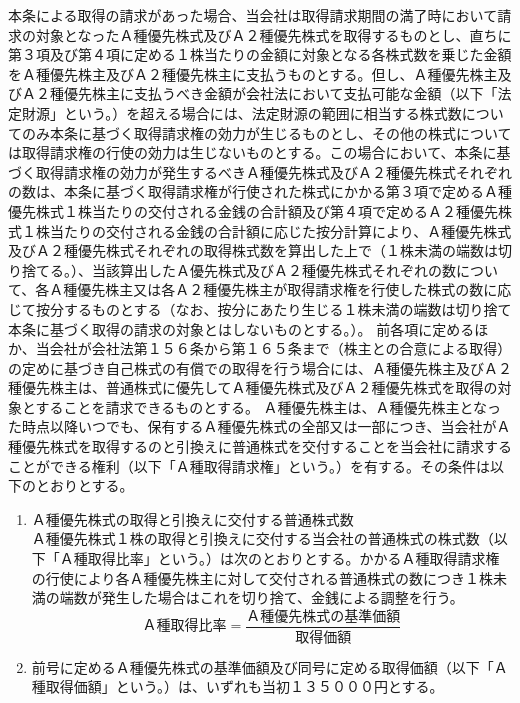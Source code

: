 \documentclass[10pt,a4paper,uplatex]{jsarticle}
\begin{document}
\term 本条による取得の請求があった場合、当会社は取得請求期間の満了時において請求の対象となったＡ種優先株式及びＡ２種優先株式を取得するものとし、直ちに第３項及び第４項に定める１株当たりの金額に対象となる各株式数を乗じた金額をＡ種優先株主及びＡ２種優先株主に支払うものとする。但し、Ａ種優先株主及びＡ２種優先株主に支払うべき金額が会社法において支払可能な金額（以下「法定財源」という。）を超える場合には、法定財源の範囲に相当する株式数についてのみ本条に基づく取得請求権の効力が生じるものとし、その他の株式については取得請求権の行使の効力は生じないものとする。この場合において、本条に基づく取得請求権の効力が発生するべきＡ種優先株式及びＡ２種優先株式それぞれの数は、本条に基づく取得請求権が行使された株式にかかる第３項で定めるＡ種優先株式１株当たりの交付される金銭の合計額及び第４項で定めるＡ２種優先株式１株当たりの交付される金銭の合計額に応じた按分計算により、Ａ種優先株式及びＡ２種優先株式それぞれの取得株式数を算出した上で（１株未満の端数は切り捨てる。）、当該算出したＡ優先株式及びＡ２種優先株式それぞれの数について、各Ａ種優先株主又は各Ａ２種優先株主が取得請求権を行使した株式の数に応じて按分するものとする（なお、按分にあたり生じる１株未満の端数は切り捨て本条に基づく取得の請求の対象とはしないものとする。）。
\term 前各項に定めるほか、当会社が会社法第１５６条から第１６５条まで（株主との合意による取得）の定めに基づき自己株式の有償での取得を行う場合には、Ａ種優先株主及びＡ２種優先株主は、普通株式に優先してＡ種優先株式及びＡ２種優先株式を取得の対象とすることを請求できるものとする。
Ａ種優先株主は、Ａ種優先株主となった時点以降いつでも、保有するＡ種優先株式の全部又は一部につき、当会社がＡ種優先株式を取得するのと引換えに普通株式を交付することを当会社に請求することができる権利（以下「Ａ種取得請求権」という。）を有する。その条件は以下のとおりとする。
\label{普通株式と引換えにする取得請求権}
\begin{enumerate}
  \item Ａ種優先株式の取得と引換えに交付する普通株式数\\
  Ａ種優先株式１株の取得と引換えに交付する当会社の普通株式の株式数（以下「Ａ種取得比率」という。）は次のとおりとする。かかるＡ種取得請求権の行使により各Ａ種優先株主に対して交付される普通株式の数につき１株未満の端数が発生した場合はこれを切り捨て、金銭による調整を行う。
  \begin{displaymath}
  Ａ種取得比率 = \frac{Ａ種優先株式の基準価額}{取得価額}
  \end{displaymath}
  \item 前号に定めるＡ種優先株式の基準価額及び同号に定める取得価額（以下「Ａ種取得価額」という。）は、いずれも当初１３５０００円とする。
\end{enumerate}
\end{document}
